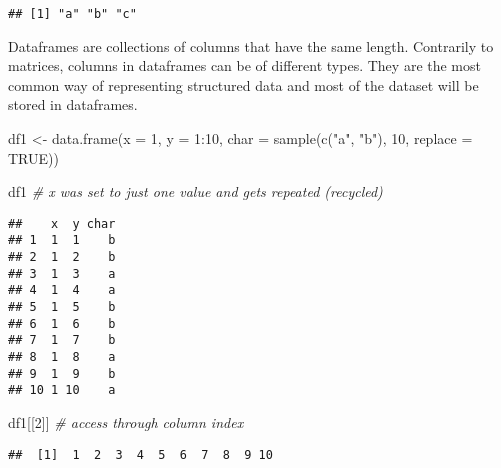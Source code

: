 \documentclass[
  oneside]{book}
\newenvironment{Shaded}{\begin{snugshade}}{\end{snugshade}}
\newcommand{\AttributeTok}[1]{\textcolor[rgb]{0.77,0.63,0.00}{#1}}
\newcommand{\CommentTok}[1]{\textcolor[rgb]{0.56,0.35,0.01}{\textit{#1}}}
\newcommand{\ConstantTok}[1]{\textcolor[rgb]{0.00,0.00,0.00}{#1}}
\newcommand{\DecValTok}[1]{\textcolor[rgb]{0.00,0.00,0.81}{#1}}
\newcommand{\FunctionTok}[1]{\textcolor[rgb]{0.00,0.00,0.00}{#1}}
\newcommand{\NormalTok}[1]{#1}
\newcommand{\OtherTok}[1]{\textcolor[rgb]{0.56,0.35,0.01}{#1}}
\newcommand{\SpecialCharTok}[1]{\textcolor[rgb]{0.00,0.00,0.00}{#1}}
\newcommand{\StringTok}[1]{\textcolor[rgb]{0.31,0.60,0.02}{#1}}
\begin{document}
\begin{Shaded}
\end{Shaded}

\begin{verbatim}
## [1] "a" "b" "c"
\end{verbatim}

Dataframes are collections of columns that have the same length.
Contrarily to matrices, columns in dataframes can be of different types.
They are the most common way of representing structured data and
most of the dataset will be stored in dataframes.

\begin{Shaded}
\begin{Highlighting}[]
\NormalTok{df1 }\OtherTok{\textless{}{-}} \FunctionTok{data.frame}\NormalTok{(}\AttributeTok{x =} \DecValTok{1}\NormalTok{, }\AttributeTok{y =} \DecValTok{1}\SpecialCharTok{:}\DecValTok{10}\NormalTok{,}
           \AttributeTok{char =} \FunctionTok{sample}\NormalTok{(}\FunctionTok{c}\NormalTok{(}\StringTok{"a"}\NormalTok{, }\StringTok{"b"}\NormalTok{), }\DecValTok{10}\NormalTok{, }\AttributeTok{replace =} \ConstantTok{TRUE}\NormalTok{))}

\NormalTok{df1 }\CommentTok{\# x was set to just one value and gets repeated (\textquotesingle{}recycled\textquotesingle{})}
\end{Highlighting}
\end{Shaded}

\begin{verbatim}
##    x  y char
## 1  1  1    b
## 2  1  2    b
## 3  1  3    a
## 4  1  4    a
## 5  1  5    b
## 6  1  6    b
## 7  1  7    b
## 8  1  8    a
## 9  1  9    b
## 10 1 10    a
\end{verbatim}

\begin{Shaded}
\begin{Highlighting}[]
\NormalTok{df1[[}\DecValTok{2}\NormalTok{]] }\CommentTok{\# access through column index}
\end{Highlighting}
\end{Shaded}

\begin{verbatim}
##  [1]  1  2  3  4  5  6  7  8  9 10
\end{verbatim}

\begin{Shaded}
\end{Shaded}
\end{document}
